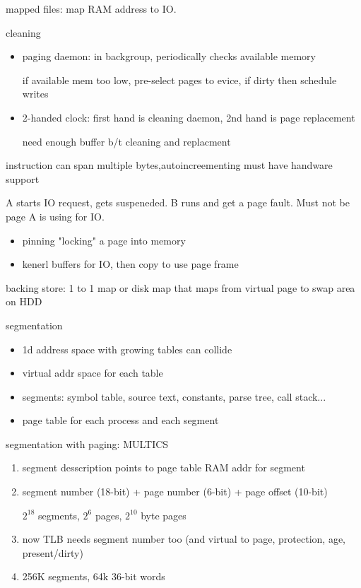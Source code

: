 \documentclass[11pt]{article}
\begin{document}
mapped files: map RAM address to IO.

cleaning
\begin{itemize}
    \item paging daemon: in backgroup, periodically checks available memory

        if available mem too low, pre-select pages to evice, if dirty then schedule writes

    \item 2-handed clock: first hand is cleaning daemon, 2nd hand is page replacement

        need enough buffer b/t cleaning and replacment
\end{itemize}

instruction can span multiple bytes,autoincreementing must have handware support

A starts IO request, gets suspeneded. B runs and get a page fault. Must not be page A is using for IO.
\begin{itemize}
    \item pinning "locking" a page into memory
    \item kenerl buffers for IO, then copy to use page frame
\end{itemize}

backing store: 1 to 1 map or disk map that maps from virtual page to swap area on HDD

segmentation
\begin{itemize}
    \item 1d address space with growing tables can collide
    \item virtual addr space for each table
    \item segments: symbol table, source text, constants, parse tree, call stack...
    \item page table for each process and each segment
\end{itemize}

segmentation with paging: MULTICS
\begin{enumerate}
    \item segment desscription points to page table RAM addr for segment
    \item segment number (18-bit) + page number (6-bit) + page offset (10-bit)

        $2^{18}$ segments, $2^6$ pages, $2^{10}$ byte pages

    \item now TLB needs segment number too (and virtual to page, protection, age, present/dirty)
    \item 256K segments, 64k 36-bit words
\end{enumerate}
\end{document}
